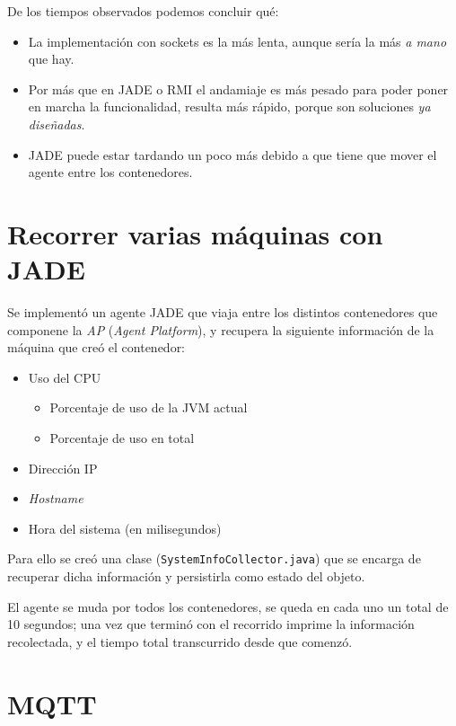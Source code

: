 De los tiempos observados podemos concluir qué:

\begin{itemize}
    \item La implementación con sockets es la más lenta, aunque sería la más \textit{a mano} que hay.
    \item Por más que en JADE o RMI el andamiaje es más pesado para poder poner en marcha la funcionalidad, resulta más rápido, porque son soluciones \textit{ya diseñadas}.
    \item JADE puede estar tardando un poco más debido a que tiene que mover el agente entre los contenedores. 
\end{itemize}

\section{Recorrer varias máquinas con JADE}

Se implementó un agente JADE que viaja entre los distintos contenedores que componene la \emph{AP} (\emph{Agent Platform}), y recupera la siguiente información de la máquina que creó el contenedor:

\begin{itemize}
    \item Uso del CPU
    \begin{itemize}
        \item Porcentaje de uso de la JVM actual
        \item Porcentaje de uso en total
    \end{itemize}
    \item Dirección IP
    \item \emph{Hostname} 
    \item Hora del sistema (en milisegundos)
\end{itemize}

Para ello se creó una clase (\texttt{SystemInfoCollector.java}) que se encarga de recuperar dicha información y persistirla como estado del objeto.

El agente se muda por todos los contenedores, se queda en cada uno un total de 10 segundos; una vez que terminó con el recorrido imprime la información recolectada, y el tiempo total transcurrido desde que comenzó.

\section{MQTT}


